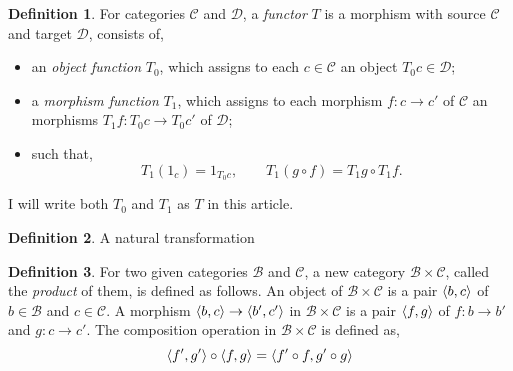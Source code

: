 \documentclass[a4paper,11pt]{article}
\theoremstyle{definition}
\newtheorem{definition}{Definition}[section]
\begin{document}
\begin{definition}
    For categories $\mathcal{C}$ and $\mathcal{D}$, a \textit{functor} $T$ is a morphism with source $\mathcal{C}$ and target $\mathcal{D}$, consists of,
    \begin{itemize}
        \item an \textit{object function} $T_0$, which assigns to each $c\in \mathcal{C}$ an object $T_0c\in \mathcal{D}$;
        \item a \textit{morphism function} $T_1$, which assigns to each morphism $f:c\to c'$ of $\mathcal{C}$ an morphisms $T_1f:T_0c\to T_0c'$ of $\mathcal{D}$;
        \item such that,
        \begin{equation}
            T_1(1_c)=1_{T_0c},\qquad T_1(g\circ f)=T_1g\circ T_1f.
        \end{equation}
    \end{itemize}
    I will write both $T_0$ and $T_1$ as $T$ in this article.
\end{definition}
\begin{definition}
    A natural transformation 
    
\end{definition}

\begin{definition}
    For two given categories $\mathcal{B}$ and $\mathcal{C}$, a new category $\mathcal{B}\times \mathcal{C}$, called the \textit{product} of them, is defined as follows. 
    An object of $\mathcal{B}\times \mathcal{C}$ is a pair $\braket{b,c}$ of $b\in \mathcal{B}$ and $c \in \mathcal{C}$. A morphism $\braket{b,c}\to\braket{b',c'}$ in $\mathcal{B}\times \mathcal{C}$
    is a pair $\braket{f,g}$ of $f:b\to b'$ and $g:c\to c'$. The composition operation in $\mathcal{B}\times \mathcal{C}$ is defined as,
    \begin{equation}    
    \braket{f',g'}\circ\braket{f,g}=\braket{f'\circ f,g'\circ g}
    \end{equation}     
\end{definition}



\end{document}

